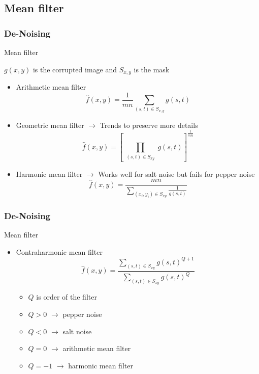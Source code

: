 \documentclass{beamer}
\begin{document}
\subsection{Mean filter}
\begin{frame}
\frametitle{De-Noising}
\begin{block}{Mean filter}
\scriptsize{
$g(x,y)$ is the corrupted image and $S_{x,y}$ is the mask
\begin{itemize}
	\item Arithmetic mean filter 
	$$\hat{f}(x,y) = \frac{1}{mn}\sum_{(s,t)\in S_{x,y}} g(s,t)$$
	\item Geometric mean filter $\rightarrow$ Trends to preserve more details
	$$ \hat{f}(x,y) = \left[ \prod_{\substack{(s,t)\in S_{xy}}} g(s,t)\right] ^\frac{1}{mn}$$
	\item Harmonic mean filter $\rightarrow$ Works well for salt noise but fails for pepper noise
	$$\hat{f}(x,y) = \frac{mn}{\sum\limits_{(x_{i},y_{i})\in S_{xy}} \frac{1}{g(s,t)}} $$ 	
	
\end{itemize}
}
\end{block}

\end{frame}
\begin{frame}
\frametitle{De-Noising}
\begin{block}{Mean filter}
\begin{itemize}
	\item Contraharmonic mean filter 
	$$\hat{f}(x,y) = \frac{\sum\limits_{(s,t)\in S_{xy}} g(s,t)^{Q+1}}{\sum\limits_{(s,t)\in S_{xy}} g(s,t)^Q}$$
	\begin{itemize}
		\item $Q$ is order of the filter 
		\item $Q > 0 $ $\rightarrow$ pepper noise
		\item $Q < 0 $ $\rightarrow$ salt noise
		\item $Q = 0 $ $\rightarrow$ arithmetic mean filter 
		\item $Q = -1 $ $\rightarrow$ harmonic mean filter
	\end{itemize}	 		
\end{itemize}
\end{block}
\end{frame}
\end{document}
